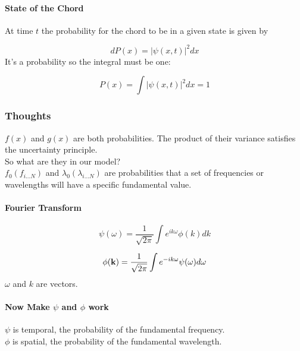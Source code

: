 \documentclass[
]{article}
\begin{document}
\paragraph{State of the Chord}\label{state-of-the-chord}

At time \(t\) the probability for the chord to be in a given state is
given by

\[dP(x) = |\psi(x,t)|^2dx\] It's a probability so the integral must be
one:

\[P(x)=\int|\psi(x,t)|^2dx=1 \]

\subsubsection{Thoughts}\label{thoughts}

\(f(x)\) and \(g(x)\) are both probabilities. The product of their
variance satisfies the uncertainty principle.\\

So what are they in our model?\\

\(f_{0}(f_{i \dots N})\) and \(\lambda_{0}(\lambda_{i \dots N})\) are
probabilities that a set of frequencies or wavelengths will have a
specific fundamental value.\\

\paragraph{Fourier Transform}\label{fourier-transform}

\[\psi({\omega})=\frac{1}{\sqrt{2 \pi}} \int e^{i k {\omega}}\phi(k)dk\]

\[\phi({\vb k})=\frac{1}{\sqrt{2 \pi}} \int e^{-i k \omega}\psi(\omega)d \omega \]
\(\omega\) and \(k\) are vectors.

\paragraph{\texorpdfstring{Now Make \(\psi\) and \(\phi\)
work}{Now Make \textbackslash psi and \textbackslash phi work}}\label{now-make-psi-and-phi-work}

\(\psi\) is temporal, the probability of the fundamental frequency.\\

\(\phi\) is spatial, the probability of the fundamental wavelength.\\
\end{document}
